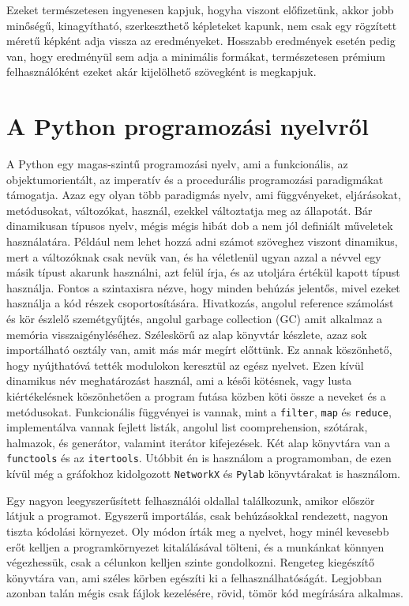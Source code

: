 \documentclass[
]{thesis-ekf}
\theoremstyle{definition}
\theoremstyle{remark}
\begin{document}
	Ezeket természetesen ingyenesen kapjuk, hogyha viszont előfizetünk, akkor jobb minőségű, kinagyítható, szerkeszthető képleteket kapunk, nem csak egy rögzített méretű képként adja vissza az eredményeket. Hosszabb eredmények esetén pedig van, hogy eredményül sem adja a minimális formákat, természetesen prémium felhasználóként ezeket akár kijelölhető szövegként is megkapjuk.
	
	\section{A Python programozási nyelvről}\label{kif-python-programnyelv}
	A Python egy magas-szintű programozási nyelv, ami a funkcionális, az objektumorientált, az imperatív és a procedurális programozási paradigmákat támogatja. Azaz egy olyan több paradigmás nyelv, ami függvényeket, eljárásokat, metódusokat, változókat, használ, ezekkel változtatja meg az állapotát. Bár dinamikusan típusos nyelv, mégis mégis hibát dob a nem jól definiált műveletek használatára. Például nem lehet hozzá adni számot szöveghez viszont dinamikus, mert a változóknak csak nevük van, és ha véletlenül ugyan azzal a névvel egy másik típust akarunk használni, azt felül írja, és az utoljára értékül kapott típust használja. Fontos a szintaxisra nézve, hogy minden behúzás jelentős, mivel ezeket használja a kód részek csoportosítására. Hivatkozás, angolul reference számolást és kör észlelő szemétgyűjtés, angolul garbage collection (GC) amit alkalmaz a memória visszaigényléséhez. Széleskörű az alap könyvtár készlete, azaz sok importálható osztály van, amit más már megírt előttünk. Ez annak köszönhető, hogy nyújthatóvá tették modulokon keresztül az egész nyelvet. Ezen kívül dinamikus név meghatározást használ, ami a késői kötésnek, vagy lusta kiértékelésnek köszönhetően a program futása közben köti össze a neveket és a metódusokat. Funkcionális függvényei is vannak, mint a \texttt{filter}, \texttt{map} és \texttt{reduce}, implementálva vannak fejlett listák, angolul list coomprehension, szótárak, halmazok, és generátor, valamint iterátor kifejezések. Két alap könyvtára van a \texttt{functools} és az \texttt{itertools}. Utóbbit én is használom a programomban, de ezen kívül még a gráfokhoz kidolgozott \texttt{NetworkX} és \texttt{Pylab} könyvtárakat is használom.
	
	Egy nagyon leegyszerűsített felhasználói oldallal találkozunk, amikor először látjuk a programot. Egyszerű importálás, csak behúzásokkal rendezett, nagyon tiszta kódolási környezet. Oly módon írták meg a nyelvet, hogy minél kevesebb erőt kelljen a programkörnyezet kitalálásával tölteni, és a munkánkat könnyen végezhessük, csak a célunkon kelljen szinte gondolkozni. Rengeteg kiegészítő könyvtára van, ami széles körben egészíti ki a felhasználhatóságát. Legjobban azonban talán mégis csak fájlok kezelésére, rövid, tömör kód megírására alkalmas.
	
\end{document}
